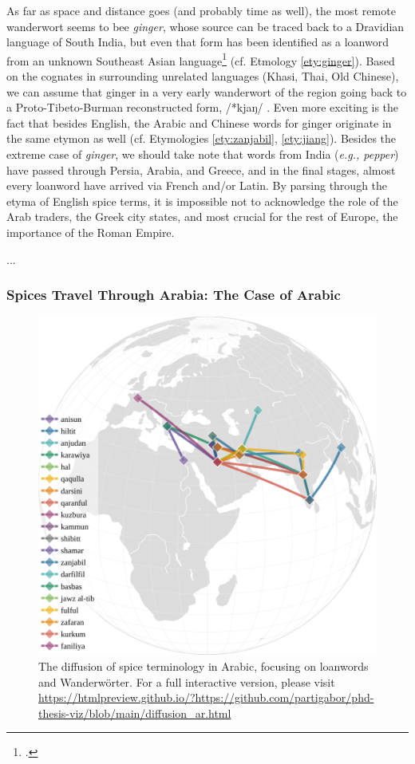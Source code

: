 As far as space and distance goes (and probably time as well), the most remote \gls{wanderwort} seems to bee \textit{ginger}, whose source can be traced back to a Dravidian language of South India, but even that form has been identified as a loanword from an unknown Southeast Asian language\footcite[ginger]{oed} (cf. Etmology \ref{ety:ginger}). Based on the cognates in surrounding unrelated languages (Khasi, Thai, Old Chinese), we can assume that ginger in a very early \gls{wanderwort} of the region going back to a Proto-Tibeto-Burman reconstructed form, /*kjaŋ/ \autocite[302]{matisoff_handbook_2003}. Even more exciting is the fact that besides English, the Arabic and Chinese words for ginger originate in the same etymon as well (cf. Etymologies \ref{ety:zanjabil}, \ref{ety:jiang}).
Besides the extreme case of \textit{ginger}, we should take note that words from India (\textit{e.g., pepper}) have passed through Persia, Arabia, and Greece, and in the final stages, almost every loanword have arrived via French and/or Latin. By parsing through the etyma of English spice terms, it is impossible not to acknowledge the role of the Arab traders, the Greek city states, and most crucial for the rest of Europe, the importance of the Roman Empire.   

...

\subsubsection{Spices Travel Through Arabia: The Case of Arabic}

\begin{figure}[ht!]
    \includegraphics[width=\linewidth]{imgs/plots/diffusion_ar.pdf}
    \caption{The diffusion of spice terminology in Arabic, focusing on loanwords and Wanderwörter. For a full interactive version, please visit \url{https://htmlpreview.github.io/?https://github.com/partigabor/phd-thesis-viz/blob/main/diffusion_ar.html}}
    \label{fig:diffusion_ar}
\end{figure}

